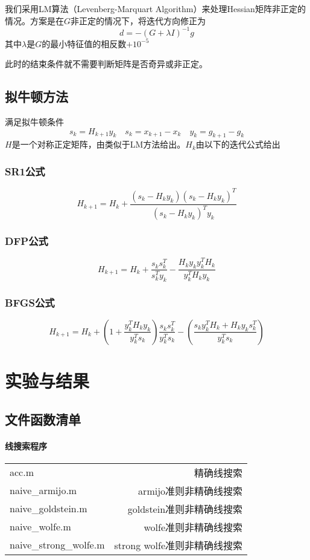 \documentclass[11pt, a4paper]{article}
\begin{document}
我们采用LM算法（Levenberg-Marquart Algorithm\cite{more1978levenberg}\cite{ranganathan2004levenberg}）来处理Hessian矩阵非正定的情况。方案是在$G$非正定的情况下，将迭代方向修正为\[d=-(G+\lambda I)^{-1}g\]其中$\lambda$是$G$的最小特征值的相反数$+10^{-5}$

此时的结束条件就不需要判断矩阵是否奇异或非正定。

\subsection{拟牛顿方法}

满足拟牛顿条件\[s_k=H_{k+1}y_k\quad s_k=x_{k+1}-x_k\quad y_k=g_{k+1}-g_k\]$H$是一个对称正定矩阵，由类似于LM方法给出。$H_k$由以下的迭代公式给出

\subsubsection{SR1公式}
\[H_{k+1}=H_k+\frac{(s_k-H_ky_k)(s_k-H_ky_k)^T}{(s_k-H_ky_k)^Ty_k}\]

\subsubsection{DFP公式}
\[H_{k+1}=H_k+\frac{s_ks_k^T}{s_k^Ty_k}-\frac{H_ky_ky_k^TH_k}{y_k^TH_ky_k}\]

\subsubsection{BFGS公式}
\[H_{k+1}=H_k+\left(1+\frac{y_k^TH_ky_k}{y_k^Ts_k}\right)\frac{s_ks_k^T}{y_k^Ts_k}-\left(\frac{s_ky_k^TH_k+H_ky_ks_k^T}{y_k^Ts_k}\right)\]

\section{实验与结果}
\subsection{文件函数清单}

\paragraph{线搜索程序}

\begin{tabular}{|l|r|}
	\hline
	acc.m & 精确线搜索\\
	naive\_armijo.m & armijo准则非精确线搜索\\
	naive\_goldstein.m & goldstein准则非精确线搜索\\
	naive\_wolfe.m & wolfe准则非精确线搜索\\
	naive\_strong\_wolfe.m & strong wolfe准则非精确线搜索\\\hline
\end{tabular}
\end{document}
